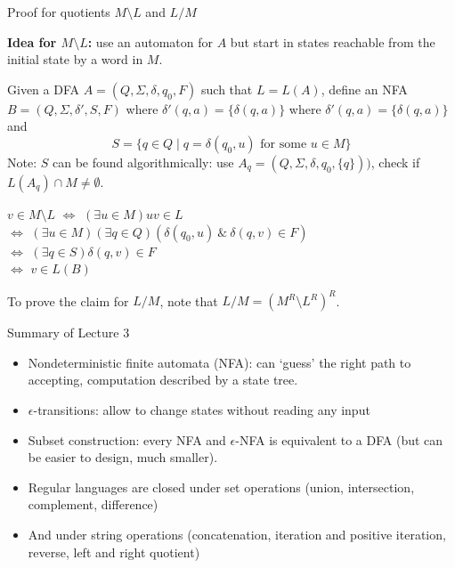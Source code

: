 \documentclass[handout]{beamer}
\begin{document}
\begin{frame}{Proof for quotients $M\setminus L$ and $L/ M$}

    

    \textbf{Idea for $M\setminus L$:} use an automaton for $A$ but start in states reachable from the initial state by a word in $M$. 
    
    Given a DFA  $A=(Q,\Sigma, \delta,q_0,F)$ such that $L=L(A)$, define an NFA $B=(Q,\Sigma,\delta',S,F)$ where $\delta'(q,a)=\{\delta(q,a)\}$ where $\delta'(q,a)=\{\delta(q,a)\}$ and
    $$
    S=\{q\in Q\mid q=\delta(q_0,u)\text{ for some }u\in M\}
    $$
    Note: $S$ can be found algorithmically: use $A_q=(Q,\Sigma, \delta,q_0,\{q\}))$, check if $L(A_q)\cap M\neq \emptyset$.
       
    $v\in M\setminus L$ $\Leftrightarrow$ $(\exists u\in M) uv\in L$ \\$\Leftrightarrow$ $(\exists u\in M)(\exists q \in Q)(\delta(q_0,u)\ \&\ \delta(q,v)\in F)$ \\$\Leftrightarrow$ $(\exists q \in S) \delta(q,v)\in F$ \\$\Leftrightarrow$ $v\in L(B)$

    To prove the claim for $L/ M$, note that $L/ M=(M^R\setminus L^R)^R$. \hfill\qedsymbol

\end{frame}


\begin{frame}{Summary of Lecture 3}

    \begin{itemize}
        \item Nondeterministic finite automata (NFA): can `guess' the right path to accepting, computation described by a state tree.
        \item $\epsilon$-transitions: allow to change states without reading any input
        \item Subset construction: every NFA and $\epsilon$-NFA is equivalent to a DFA (but can be easier to design, much smaller).
        \item Regular languages are closed under set operations (union, intersection, complement, difference)
        \item And under string operations (concatenation, iteration and positive iteration, reverse, left and right quotient)
    \end{itemize}

\end{frame}
\end{document}
